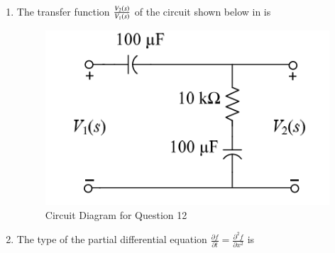 \documentclass[journal,12pt,onecolumn]{IEEEtran}
\theoremstyle{remark}
\begin{document}
\begin{enumerate}
\item The transfer function $\frac{V_2\left(s\right)}{V_1\left(s\right)}$ of the circuit shown below in  is
\par \hfill{}
\begin{figure}[H]
\centering
\includegraphics[width=0.3\columnwidth]{Figs/Q-12.png}
\caption{Circuit Diagram for Question 12}
\label{12}
\end{figure}
\begin{enumerate}
\end{enumerate}

\item The type of the partial differential equation $\frac{\partial f}{\partial t} = \frac{\partial^2 f}{\partial x^2}$ is
\par \hfill{}
    \begin{enumerate}
    \end{enumerate}


\end{enumerate}
\end{document}
